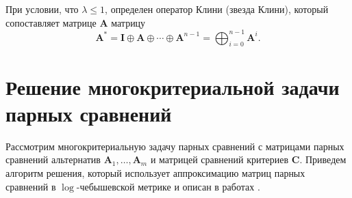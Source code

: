 \documentclass[specialist, substylefile = spbureport.rtx,
               subf,href,colorlinks=true, 12pt]{disser}
\begin{document}
    При условии, что $\lambda\leq1$, определен оператор Клини (звезда Клини), который сопоставляет матрице $\bm{A}$ матрицу
    \begin{equation*}
    \bm{A}^{\ast}
    =
    \bm{I}\oplus\bm{A}\oplus\cdots\oplus\bm{A}^{n-1}
    =
    \bigoplus_{i=0}^{n-1}\bm{A}^{i}.
    \end{equation*}

    \chapter{Решение многокритериальной задачи парных сравнений}

    Рассмотрим многокритериальную задачу парных сравнений с матрицами парных сравнений альтернатив $\bm{A}_{1},\ldots,\bm{A}_{m}$ и матрицей сравнений критериев $\bm{C}$. Приведем алгоритм решения, который использует аппроксимацию матриц парных сравнений в $\log$-че\-бы\-шевской метрике и описан в работах \cite{Krivulin2019Metody,Krivulin2019Tropical,Krivulin2022Using}. 
\end{document}
